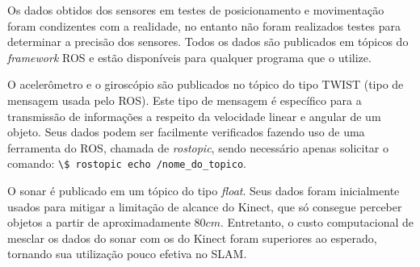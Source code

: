 Os dados obtidos dos sensores em testes de posicionamento e movimentação foram condizentes com a realidade, no entanto não foram realizados testes para determinar a precisão dos sensores. Todos os dados são publicados em tópicos do \textit{framework} ROS e estão disponíveis para qualquer programa que o utilize.

O acelerômetro e o giroscópio são publicados no tópico do tipo TWIST (tipo de mensagem usada pelo ROS). Este tipo de mensagem é específico para a transmissão de informações a respeito da velocidade linear e angular de um objeto. Seus dados podem ser facilmente verificados fazendo uso de uma ferramenta do ROS, chamada de \textit{rostopic}, sendo necessário apenas solicitar o comando: \verb|\$ rostopic echo /nome_do_topico|.

O sonar é publicado em um tópico do tipo \textit{float}. Seus dados foram inicialmente usados para mitigar a limitação de alcance do Kinect, que só consegue perceber objetos a partir de aproximadamente $80cm$. Entretanto, o custo computacional de mesclar os dados do sonar com os do Kinect foram superiores ao esperado, tornando sua utilização pouco efetiva no SLAM.